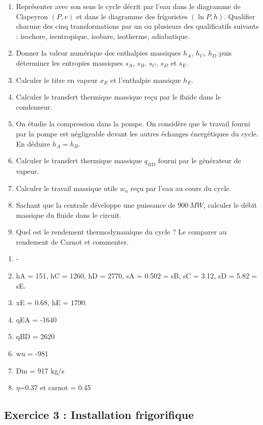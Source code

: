 \begin{enumerate}
	\item Représenter avec son sens le cycle décrit par l'eau dans le diagramme de Clapeyron $(P, v)$ et dans le diagramme des frigoristes $(\ln P, h)$. Qualifier chacune des cinq transformations par un ou plusieurs des qualificatifs suivants : isochore, isentropique, isobare, isotherme, adiabatique.
	\item Donner la valeur numérique des enthalpies massiques $h_A$, $h_C$, $h_D$ puis déterminer les entropies massiques $s_A$, $s_B$, $s_C$, $s_D$ et $s_E$.
	\item Calculer le titre en vapeur $x_E$ et l'enthalpie massique $h_E$.
	\item Calculer le transfert thermique massique reçu par le fluide dans le condenseur.
	\item On étudie la compression dans la pompe. On considère que le travail fourni par la pompe est négligeable devant les autres échanges énergétiques du cycle. En déduire $h_A = h_B$.
	\item Calculer le transfert thermique massique $q_{BD}$ fourni par le générateur de vapeur.
	\item Calculer le travail massique utile $w_u$ reçu par l'eau au cours du cycle.
	\item Sachant que la centrale développe une puissance de $\SI{900}{MW}$, calculer le débit massique du fluide dans le circuit.
	\item Quel est le rendement thermodynamique du cycle ? Le comparer au rendement de Carnot et commenter.
\end{enumerate}

\begin{enumerate}
	\item -
	\item hA = 151, hC = 1260, hD = 2770, sA = 0.502 = sB, sC = 3.12, sD = 5.82 = sE.
	\item xE = 0.68, hE = 1790.
	\item qEA = -1640
	\item qBD = 2620
	\item wu = -981
	\item Dm = 917 kg/s
	\item $\eta$=0.37 et carnot = 0.45	
\end{enumerate}

\subsection{Exercice 3 : Installation frigorifique}

